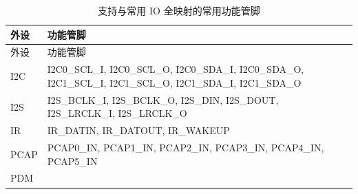 \documentclass[
  12pt,
]{book}
\begin{document}
\begin{longtable}[]{@{}ll@{}}
\caption{\label{tab:ch-pinctrl-common-set} 支持与常用 IO 全映射的常用功能管脚}\tabularnewline
\toprule
\begin{minipage}[b]{0.09\columnwidth}\raggedright
外设\strut
\end{minipage} & \begin{minipage}[b]{0.85\columnwidth}\raggedright
功能管脚\strut
\end{minipage}\tabularnewline
\midrule
\endfirsthead
\toprule
\begin{minipage}[b]{0.09\columnwidth}\raggedright
外设\strut
\end{minipage} & \begin{minipage}[b]{0.85\columnwidth}\raggedright
功能管脚\strut
\end{minipage}\tabularnewline
\midrule
\endhead
\begin{minipage}[t]{0.09\columnwidth}\raggedright
I2C\strut
\end{minipage} & \begin{minipage}[t]{0.85\columnwidth}\raggedright
I2C0\_SCL\_I, I2C0\_SCL\_O, I2C0\_SDA\_I, I2C0\_SDA\_O, I2C1\_SCL\_I, I2C1\_SCL\_O, I2C1\_SDA\_I, I2C1\_SDA\_O\strut
\end{minipage}\tabularnewline
\begin{minipage}[t]{0.09\columnwidth}\raggedright
I2S\strut
\end{minipage} & \begin{minipage}[t]{0.85\columnwidth}\raggedright
I2S\_BCLK\_I, I2S\_BCLK\_O, I2S\_DIN, I2S\_DOUT, I2S\_LRCLK\_I, I2S\_LRCLK\_O\strut
\end{minipage}\tabularnewline
\begin{minipage}[t]{0.09\columnwidth}\raggedright
IR\strut
\end{minipage} & \begin{minipage}[t]{0.85\columnwidth}\raggedright
IR\_DATIN, IR\_DATOUT, IR\_WAKEUP\strut
\end{minipage}\tabularnewline
\begin{minipage}[t]{0.09\columnwidth}\raggedright
PCAP\strut
\end{minipage} & \begin{minipage}[t]{0.85\columnwidth}\raggedright
PCAP0\_IN, PCAP1\_IN, PCAP2\_IN, PCAP3\_IN, PCAP4\_IN, PCAP5\_IN\strut
\end{minipage}\tabularnewline
\begin{minipage}[t]{0.09\columnwidth}\raggedright
PDM\strut
\end{minipage} & \begin{minipage}[t]{0.85\columnwidth}\raggedright

\end{minipage}
\end{longtable}
\end{document}
